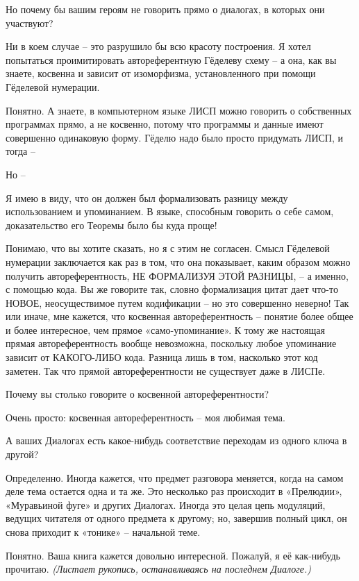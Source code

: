 \documentclass[../main.tex]{subfiles}
\begin{document}
\begin{dialogue}
 Но почему бы вашим героям не говорить прямо о диалогах, в которых они участвуют?

 Ни в коем случае \--- это разрушило бы всю красоту построения. Я хотел попытаться проимитировать автореферентную Гёделеву схему \--- а она, как вы знаете, косвенна и зависит от изоморфизма, установленного при помощи Гёделевой нумерации.

 Понятно. А знаете, в компьютерном языке ЛИСП можно говорить о собственных программах прямо, а не косвенно, потому что программы и данные имеют совершенно одинаковую форму. Гёделю надо было просто придумать ЛИСП, и тогда \---

 Но \---

 Я имею в виду, что он должен был формализовать разницу между использованием и упоминанием. В языке, способным говорить о себе самом, доказательство его Теоремы было бы куда проще!

 Понимаю, что вы хотите сказать, но я с этим не согласен. Смысл Гёделевой нумерации заключается как раз в том, что она показывает, каким образом можно получить автореферентность, НЕ ФОРМАЛИЗУЯ ЭТОЙ РАЗНИЦЫ, \--- а именно, с помощью кода. Вы же говорите так, словно формализация цитат дает что-то НОВОЕ, неосуществимое путем кодификации \--- но это совершенно неверно! Так или иначе, мне кажется, что косвенная автореферентность \--- понятие более общее и более интересное, чем прямое «само-упоминание». К тому же настоящая прямая автореферентность вообще невозможна, поскольку любое упоминание зависит от КАКОГО-ЛИБО кода. Разница лишь в том, насколько этот код заметен. Так что прямой автореферентности не существует даже в ЛИСПе.

 Почему вы столько говорите о косвенной автореферентности?

 Очень просто: косвенная автореферентность \--- моя любимая тема.

 А ваших Диалогах есть какое-нибудь соответствие переходам из одного ключа в другой?

 Определенно. Иногда кажется, что предмет разговора меняется, когда на самом деле тема остается одна и та же. Это несколько раз происходит в «Прелюдии», «Муравьиной фуге» и других Диалогах. Иногда это целая цепь модуляций, ведущих читателя от одного предмета к другому; но, завершив полный цикл, он снова приходит к «тонике» \--- начальной теме.

 Понятно. Ваша книга кажется довольно интересной. Пожалуй, я её как-нибудь прочитаю. \emph{(Листает рукопись, останавливаясь на последнем Диалоге.)}


\end{dialogue}
\end{document}

